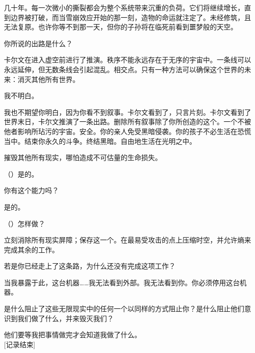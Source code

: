 \begin{greenrecordbox}
几十年。每一次微小的撕裂都会为整个系统带来沉重的负荷。它们将继续增长，直到边界被打破，而当雪崩效应开始的那一刻，造物的命运就注定了。未经修筑，且无法复原。也许你等不到那一天，但你的子孙将在临死前看到噩梦般的天空。

你所说的出路是什么？

卡尔文在进入虚空前进行了推演。秩序不能永远存在于无序的宇宙中。一条线可以永远延伸，但无数条线会引起混乱。相交点。只有一种方法可以确保这个世界的未来：消灭其他所有世界。

我不明白。

我也不期望你明白，因为你看不到叙事。卡尔文看到了，只言片刻。卡尔文看到了世界末日，卡尔文推演了一条出路。删除所有叙事除了你所创造的这个。一个不被他者影响所玷污的宇宙。安全。你的亲人免受黑暗侵袭。你的孩子不必生活在恐慌当中。结束你永久的斗争。终结黑暗。自由地生活在光明之中。

摧毁其他所有现实，哪怕造成不可估量的生命损失。

（）是的。

你有这个能力吗？

是的。

（）怎样做？

立刻消除所有现实屏障；保存这一个。在最易受攻击的点上压缩时空，并允许熵来完成其余的工作。

若是你已经走上了这条路，为什么还没有完成这项工作？

当我暴露于此，这台机器……我无法看到外部。我无法看到你。你必须停用这台机器。

是什么阻止了这些无限现实中的任何一个以同样的方式阻止你？是什么阻止他们意识到我们做了什么，并来毁灭我们？

他们要等我把事情做完才会知道我做了什么。\\
{[}记录结束]

\end{greenrecordbox}


\newpage

\begin{center}

\hr

\\

\hr

\end{center}

